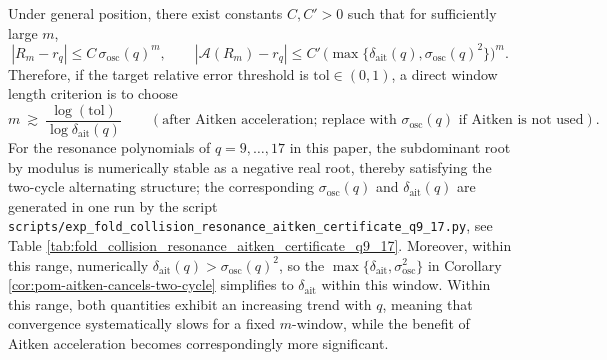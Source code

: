 \begin{remark}\label{rem:pom-aitken-window-audit}
Under general position, there exist constants \(C,C'>0\) such that for sufficiently large \(m\),
\[
\left|R_m-r_q\right|\le C\,\sigma_{\mathrm{osc}}(q)^{m},
\qquad
\left|\mathcal{A}(R_m)-r_q\right|\le C'\,\bigl(\max\{\delta_{\mathrm{ait}}(q),\sigma_{\mathrm{osc}}(q)^2\}\bigr)^{m}.
\]
Therefore, if the target relative error threshold is \(\mathrm{tol}\in(0,1)\), a direct window length criterion is to choose
\[
m\ \gtrsim\ \frac{\log(\mathrm{tol})}{\log \delta_{\mathrm{ait}}(q)}
\qquad(\text{after Aitken acceleration; replace with }\sigma_{\mathrm{osc}}(q)\text{ if Aitken is not used}).
\]
For the resonance polynomials of \(q=9,\dots,17\) in this paper, the subdominant root by modulus is numerically stable as a negative real root, thereby satisfying the two-cycle alternating structure; the corresponding \(\sigma_{\mathrm{osc}}(q)\) and \(\delta_{\mathrm{ait}}(q)\) are generated in one run by the script \texttt{scripts/exp\_fold\_collision\_resonance\_aitken\_certificate\_q9\_17.py}, see Table \ref{tab:fold_collision_resonance_aitken_certificate_q9_17}.
Moreover, within this range, numerically \(\delta_{\mathrm{ait}}(q)>\sigma_{\mathrm{osc}}(q)^2\), so the \(\max\{\delta_{\mathrm{ait}},\sigma_{\mathrm{osc}}^2\}\) in Corollary \ref{cor:pom-aitken-cancels-two-cycle} simplifies to \(\delta_{\mathrm{ait}}\) within this window.
Within this range, both quantities exhibit an increasing trend with \(q\), meaning that convergence systematically slows for a fixed \(m\)-window, while the benefit of Aitken acceleration becomes correspondingly more significant.
\end{remark}

